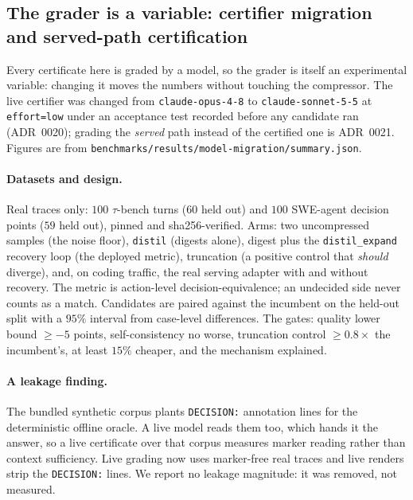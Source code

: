 \documentclass{article}
\begin{document}
\subsection{The grader is a variable: certifier migration and served-path certification}
Every certificate here is graded by a model, so the grader is itself an experimental variable:
changing it moves the numbers without touching the compressor. The live certifier was changed
from \texttt{claude-opus-4-8} to \texttt{claude-sonnet-5-5} at \texttt{effort=low} under an
acceptance test recorded before any candidate ran (ADR~0020); grading the \emph{served} path
instead of the certified one is ADR~0021. Figures are from
\texttt{benchmarks/results/model-migration/summary.json}.

\paragraph{Datasets and design.} Real traces only: $100$ $\tau$-bench turns ($60$ held out) and
$100$ SWE-agent decision points ($59$ held out), pinned and sha256-verified. Arms: two
uncompressed samples (the noise floor), \texttt{distil} (digests alone), digest plus the
\texttt{distil\_expand} recovery loop (the deployed metric), truncation (a positive control that
\emph{should} diverge), and, on coding traffic, the real serving adapter with and without
recovery. The metric is action-level decision-equivalence; an undecided side never counts as a
match. Candidates are paired against the incumbent on the held-out split with a $95\%$ interval
from case-level differences. The gates: quality lower bound $\ge -5$ points, self-consistency no
worse, truncation control $\ge 0.8\times$ the incumbent's, at least $15\%$ cheaper, and the
mechanism explained.

\paragraph{A leakage finding.} The bundled synthetic corpus plants \texttt{DECISION:} annotation
lines for the deterministic offline oracle. A live model reads them too, which hands it the
answer, so a live certificate over that corpus measures marker reading rather than context
sufficiency. Live grading now uses marker-free real traces and live renders strip the
\texttt{DECISION:} lines. We report no leakage magnitude: it was removed, not measured.
\end{document}
